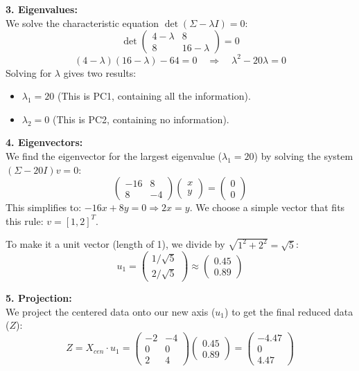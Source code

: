 \documentclass[12pt, a4paper]{report}
\begin{document}
\textbf{3. Eigenvalues:} \\
We solve the characteristic equation $\det(\Sigma - \lambda I) = 0$:
\[
\det \begin{pmatrix} 4-\lambda & 8 \\ 8 & 16-\lambda \end{pmatrix} = 0
\]
\[
(4-\lambda)(16-\lambda) - 64 = 0 \quad \Rightarrow \quad \lambda^2 - 20\lambda = 0
\]
Solving for $\lambda$ gives two results:
\begin{itemize}
    \item $\lambda_1 = 20$ (This is PC1, containing all the information).
    \item $\lambda_2 = 0$ (This is PC2, containing no information).
\end{itemize}

\textbf{4. Eigenvectors:} \\
We find the eigenvector for the largest eigenvalue ($\lambda_1 = 20$) by solving the system $(\Sigma - 20I)v = 0$:
\[
\begin{pmatrix} -16 & 8 \\ 8 & -4 \end{pmatrix} \begin{pmatrix} x \\ y \end{pmatrix} = \begin{pmatrix} 0 \\ 0 \end{pmatrix}
\]
This simplifies to: $-16x + 8y = 0 \Rightarrow 2x = y$. We choose a simple vector that fits this rule: $v = [1, 2]^T$.

To make it a unit vector (length of 1), we divide by $\sqrt{1^2 + 2^2} = \sqrt{5}$:
\[
u_1 = \begin{pmatrix} 1/\sqrt{5} \\ 2/\sqrt{5} \end{pmatrix} \approx \begin{pmatrix} 0.45 \\ 0.89 \end{pmatrix}
\]

\textbf{5. Projection:} \\
We project the centered data onto our new axis ($u_1$) to get the final reduced data ($Z$):
\[
Z = X_{cen} \cdot u_1 = \begin{pmatrix} -2 & -4 \\ 0 & 0 \\ 2 & 4 \end{pmatrix} \begin{pmatrix} 0.45 \\ 0.89 \end{pmatrix} = \begin{pmatrix} -4.47 \\ 0 \\ 4.47 \end{pmatrix}
\]
\end{document}

